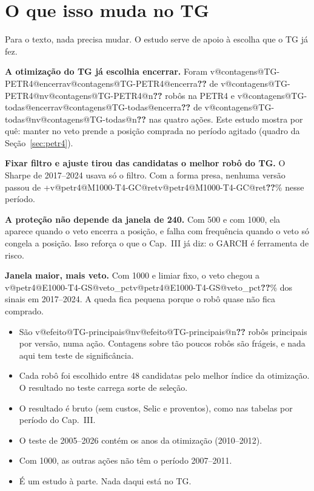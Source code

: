 \documentclass[11pt,a4paper]{article}
\makeatletter
\newcommand{\V}[3]{\ifcsname v@#1@#2@#3\endcsname\csname v@#1@#2@#3\endcsname\else\textbf{\color{red}??}\fi}
\makeatother
\begin{document}
\section{O que isso muda no TG}
\label{sec:fecho}

Para o texto, nada precisa mudar. O estudo serve de apoio à escolha que o TG já fez.

\textbf{A otimização do TG já escolhia encerrar.} Foram \V{contagens}{TG-PETR4}{encerra} de
\V{contagens}{TG-PETR4}{n} robôs na PETR4 e \V{contagens}{TG-todas}{encerra} de \V{contagens}{TG-todas}{n} nas
quatro ações. Este estudo mostra por quê: manter no veto prende a posição comprada no período agitado (quadro
da Seção~\ref{sec:petr4}).

\textbf{Fixar filtro e ajuste tirou das candidatas o melhor robô do TG.} O Sharpe de 2017--2024 usava só o
filtro. Com a forma presa, nenhuma versão passou de +\V{petr4}{M1000-T4-GC}{ret}\% nesse período.

\textbf{A proteção não depende da janela de 240.} Com 500 e com 1000, ela aparece quando o veto encerra a
posição, e falha com frequência quando o veto só congela a posição. Isso reforça o que o Cap.~III já diz: o GARCH
é ferramenta de risco.

\textbf{Janela maior, mais veto.} Com 1000 e limiar fixo, o veto chegou a \V{petr4}{E1000-T4-GS}{veto_pct}\% dos
sinais em 2017--2024. A queda fica pequena porque o robô quase não fica comprado.

\begin{cuidado}
\begin{itemize}\setlength{\itemsep}{1pt}
\item São \V{efeito}{TG-principais}{n} robôs principais por versão, numa ação. Contagens sobre tão poucos robôs
  são frágeis, e nada aqui tem teste de significância.
\item Cada robô foi escolhido entre 48 candidatas pelo melhor índice da otimização. O resultado no teste carrega
  sorte de seleção.
\item O resultado é bruto (sem custos, Selic e proventos), como nas tabelas por período do Cap.~III.
\item O teste de 2005--2026 contém os anos da otimização (2010--2012).
\item Com 1000, as outras ações não têm o período 2007--2011.
\item É um estudo à parte. Nada daqui está no TG.
\end{itemize}
\end{cuidado}
\end{document}
